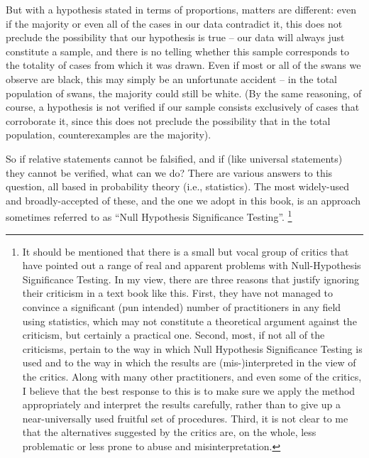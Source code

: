 But with a hypothesis stated in terms of proportions, matters are different: even if the majority or even all of the cases in our data contradict it, this does not preclude the possibility that our hypothesis is true -- our data will always just constitute a sample, and there is no telling whether this sample corresponds to the totality of cases from which it was drawn. Even if most or all of the swans we observe are black, this may simply be an unfortunate accident -- in the total population of swans, the majority could still be white. (By the same reasoning, of course, a hypothesis is not verified if our sample consists exclusively of cases that corroborate it, since this does not preclude the possibility that in the total population, counterexamples are the majority).

So if relative statements cannot be falsified, and if (like universal statements) they cannot be verified, what can we do? There are various answers to this question, all based in probability theory (i.e., statistics). The most widely-used and broadly-accepted of these, and the one we adopt in this book, is an approach sometimes referred to as ``Null Hypothesis Significance Testing''. \footnote{It should be mentioned that there is a small but vocal group of critics that have pointed out a range of real and apparent problems with Null-Hypothesis Significance Testing. In my view, there are three reasons that justify ignoring their criticism in a text book like this. First, they have not managed to convince a significant (pun intended) number of practitioners in any field using statistics, which may not constitute a theoretical argument against the criticism, but certainly a practical one. Second, most, if not all of the criticisms, pertain to the way in which Null Hypothesis Significance Testing is used and to the way in which the results are (mis-)interpreted in the view of the critics. Along with many other practitioners, and even some of the critics, I believe that the best response to this is to make sure we apply the method appropriately and interpret the results carefully, rather than to give up a near-universally used fruitful set of procedures. Third, it is not clear to me that the alternatives suggested by the critics are, on the whole, less problematic or less prone to abuse and misinterpretation.}

